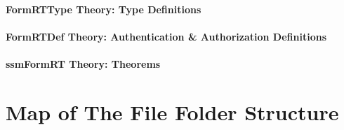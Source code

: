 \documentclass[hidelinks,12pt,a4paper]{report}
\begin{document}
\begin{appendices}
\subsubsection{FormRTType Theory: Type Definitions}
\subsubsection{FormRTDef Theory: Authentication \& Authorization Definitions}
\subsubsection{ssmFormRT Theory: Theorems}

\chapter{Map of The File Folder Structure}

\end{appendices}\cleardoublepage



\doublespacing
\end{document}

